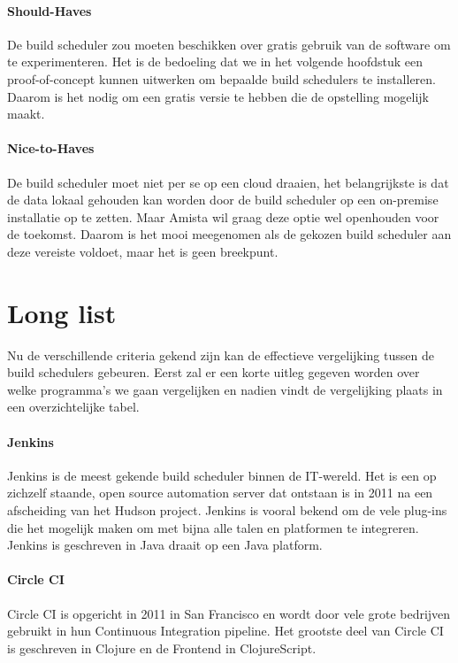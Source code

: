 \paragraph{Should-Haves}
De build scheduler zou moeten beschikken over gratis gebruik van de software om te experimenteren. Het is de bedoeling dat we in het volgende hoofdstuk een proof-of-concept kunnen uitwerken om bepaalde build schedulers te installeren. Daarom is het nodig om een gratis versie te hebben die de opstelling mogelijk maakt.


\paragraph{Nice-to-Haves}
De build scheduler moet niet per se op een cloud draaien, het belangrijkste is dat de data lokaal gehouden kan worden door de build scheduler op een on-premise installatie op te zetten. Maar Amista wil graag deze optie wel openhouden voor de toekomst. Daarom is het mooi meegenomen als de gekozen build scheduler aan deze vereiste voldoet, maar het is geen breekpunt.

\section{Long list}
\label{sec:Long-list}
Nu de verschillende criteria gekend zijn kan de effectieve vergelijking tussen de build schedulers gebeuren.
Eerst zal er een korte uitleg gegeven worden over welke programma's we gaan vergelijken en nadien vindt de vergelijking plaats in een overzichtelijke tabel.

\paragraph{Jenkins}
Jenkins is de meest gekende build scheduler binnen de IT-wereld. Het is een op zichzelf staande, open source automation server dat ontstaan is in 2011 na een afscheiding van het Hudson project. Jenkins is vooral bekend om de vele plug-ins die het mogelijk maken om met bijna alle talen en platformen te integreren. Jenkins is geschreven in Java draait op een Java platform.

\paragraph{Circle CI}
Circle CI is opgericht in 2011 in San Francisco en wordt door vele grote bedrijven gebruikt in hun Continuous Integration pipeline. Het grootste deel van Circle CI is geschreven in Clojure en de Frontend in ClojureScript. 


